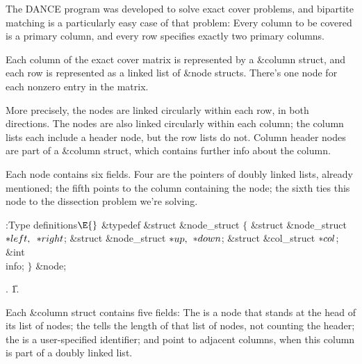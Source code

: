 The {\mc DANCE} program was developed to solve exact
cover problems,
and bipartite matching is a particularly easy case of that problem:
Every column to be covered is a primary column, and every row specifies
exactly two primary columns.

Each column of the exact cover matrix is represented by a \&{column} struct,
and each row is represented as a linked list of \&{node} structs. There's one
node for each nonzero entry in the matrix.

More precisely, the nodes are linked circularly within each row, in
both directions. The nodes are also linked circularly within each column;
the column lists each include a header node, but the row lists do not.
Column header nodes are part of a \&{column} struct, which
contains further info about the column.

Each node contains six fields. Four are the pointers of doubly linked lists,
already mentioned; the fifth points to the column containing the node;
the sixth ties this node to the dissection problem we're solving.

\Y\B\4:Type definitions\X${}\E{}$\6
\&{typedef} \&{struct} \&{node\_struct} ${}\{{}$\1\6
\&{struct} \&{node\_struct} ${}{*}\\{left},{}$ ${}{*}\\{right}{}$;\6
\&{struct} \&{node\_struct} ${}{*}\\{up},{}$ ${}{*}\\{down}{}$;\6
\&{struct} \&{col\_struct} ${}{*}\\{col}{}$;\6
\&{int} \\{info};%
\2\6
${}\}{}$ \&{node};\par
{}.
\U1.\fi

Each \&{column} struct contains five fields:
The  is a node that stands at the head of its list of nodes;
the  tells the length of that list of nodes, not counting the
header;
the  is a user-specified identifier;
 and  point to adjacent columns, when this
column is part of a doubly linked list.

